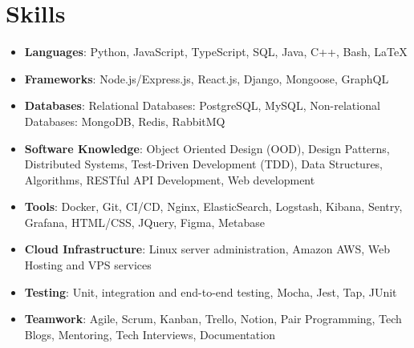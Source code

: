 \documentclass[letterpaper,10.8pt]{article}
\newcommand{\resumeItemWithTitle}[2]{
  \item\small{
    \textbf{#1}{: #2 \vspace{-4pt}}
  }
}
\newcommand{\resumeSubHeadingListStart}{\begin{itemize}[leftmargin=*]}
\newcommand{\resumeSubHeadingListEnd}{\end{itemize}}
\begin{document}
%
\section{Skills}
\resumeSubHeadingListStart
	\resumeItemWithTitle{Languages}{Python, JavaScript, TypeScript, SQL, Java, C++, Bash, LaTeX} 
    \resumeItemWithTitle{Frameworks}{Node.js/Express.js, React.js, Django, Mongoose, GraphQL} 
    \resumeItemWithTitle{Databases}{Relational Databases: PostgreSQL, MySQL, Non-relational Databases: MongoDB, Redis, RabbitMQ}
    \resumeItemWithTitle{Software Knowledge}{Object Oriented Design (OOD), Design Patterns, Distributed Systems, Test-Driven Development (TDD), Data Structures, Algorithms, RESTful API Development, Web development}
    \resumeItemWithTitle{Tools}{Docker, Git, CI/CD, Nginx, ElasticSearch, Logstash, Kibana, Sentry, Grafana, HTML/CSS, JQuery, Figma, Metabase}
    \resumeItemWithTitle{Cloud Infrastructure}{Linux server administration, Amazon AWS, Web Hosting and VPS services}
    \resumeItemWithTitle{Testing}{Unit, integration and end-to-end testing, Mocha, Jest, Tap, JUnit}
    \resumeItemWithTitle{Teamwork}{Agile, Scrum, Kanban, Trello, Notion, Pair Programming, Tech Blogs, Mentoring, Tech Interviews, Documentation}
\resumeSubHeadingListEnd


\end{document}
